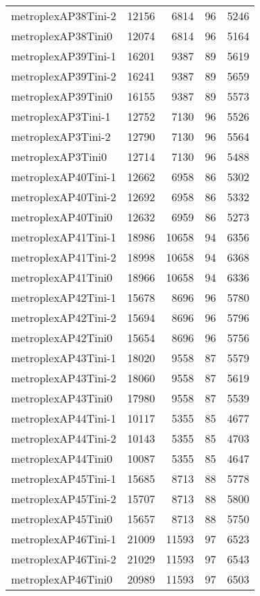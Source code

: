 \documentclass[../../../thesis.tex]{subfiles}
\begin{document}
\begin{longtable}{lrrrr}
metroplexAP38Tini-2 & 12156 & 6814 & 96 & 5246 \\
metroplexAP38Tini0 & 12074 & 6814 & 96 & 5164 \\
metroplexAP39Tini-1 & 16201 & 9387 & 89 & 5619 \\
metroplexAP39Tini-2 & 16241 & 9387 & 89 & 5659 \\
metroplexAP39Tini0 & 16155 & 9387 & 89 & 5573 \\
metroplexAP3Tini-1 & 12752 & 7130 & 96 & 5526 \\
metroplexAP3Tini-2 & 12790 & 7130 & 96 & 5564 \\
metroplexAP3Tini0 & 12714 & 7130 & 96 & 5488 \\
metroplexAP40Tini-1 & 12662 & 6958 & 86 & 5302 \\
metroplexAP40Tini-2 & 12692 & 6958 & 86 & 5332 \\
metroplexAP40Tini0 & 12632 & 6959 & 86 & 5273 \\
metroplexAP41Tini-1 & 18986 & 10658 & 94 & 6356 \\
metroplexAP41Tini-2 & 18998 & 10658 & 94 & 6368 \\
metroplexAP41Tini0 & 18966 & 10658 & 94 & 6336 \\
metroplexAP42Tini-1 & 15678 & 8696 & 96 & 5780 \\
metroplexAP42Tini-2 & 15694 & 8696 & 96 & 5796 \\
metroplexAP42Tini0 & 15654 & 8696 & 96 & 5756 \\
metroplexAP43Tini-1 & 18020 & 9558 & 87 & 5579 \\
metroplexAP43Tini-2 & 18060 & 9558 & 87 & 5619 \\
metroplexAP43Tini0 & 17980 & 9558 & 87 & 5539 \\
metroplexAP44Tini-1 & 10117 & 5355 & 85 & 4677 \\
metroplexAP44Tini-2 & 10143 & 5355 & 85 & 4703 \\
metroplexAP44Tini0 & 10087 & 5355 & 85 & 4647 \\
metroplexAP45Tini-1 & 15685 & 8713 & 88 & 5778 \\
metroplexAP45Tini-2 & 15707 & 8713 & 88 & 5800 \\
metroplexAP45Tini0 & 15657 & 8713 & 88 & 5750 \\
metroplexAP46Tini-1 & 21009 & 11593 & 97 & 6523 \\
metroplexAP46Tini-2 & 21029 & 11593 & 97 & 6543 \\
metroplexAP46Tini0 & 20989 & 11593 & 97 & 6503 \\

\end{longtable}
\end{document}
